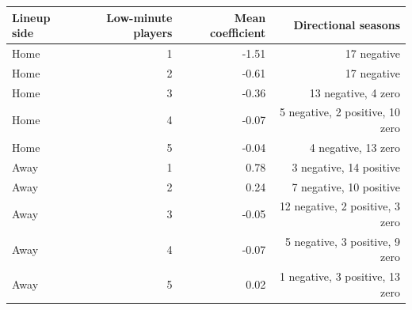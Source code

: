 \begin{tabular}{lrrr}
\toprule
Lineup side & Low-minute players & Mean coefficient & Directional seasons \\
\midrule
Home & 1 & -1.51 & 17 negative \\
Home & 2 & -0.61 & 17 negative \\
Home & 3 & -0.36 & 13 negative, 4 zero \\
Home & 4 & -0.07 & 5 negative, 2 positive, 10 zero \\
Home & 5 & -0.04 & 4 negative, 13 zero \\
Away & 1 & 0.78 & 3 negative, 14 positive \\
Away & 2 & 0.24 & 7 negative, 10 positive \\
Away & 3 & -0.05 & 12 negative, 2 positive, 3 zero \\
Away & 4 & -0.07 & 5 negative, 3 positive, 9 zero \\
Away & 5 & 0.02 & 1 negative, 3 positive, 13 zero \\
\bottomrule
\end{tabular}
